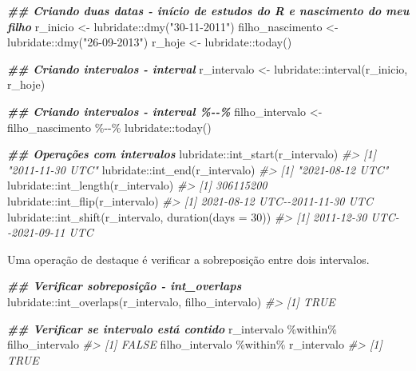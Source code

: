 \documentclass[
]{book}
\newenvironment{Shaded}{\begin{snugshade}}{\end{snugshade}}
\newcommand{\AttributeTok}[1]{\textcolor[rgb]{0.61,0.61,0.61}{#1}}
\newcommand{\CommentTok}[1]{\textcolor[rgb]{0.37,0.37,0.37}{\textit{#1}}}
\newcommand{\DecValTok}[1]{\textcolor[rgb]{0.06,0.06,0.06}{#1}}
\newcommand{\DocumentationTok}[1]{\textcolor[rgb]{0.37,0.37,0.37}{\textbf{\textit{#1}}}}
\newcommand{\FunctionTok}[1]{\textcolor[rgb]{0,0,0}{#1}}
\newcommand{\NormalTok}[1]{#1}
\newcommand{\OtherTok}[1]{\textcolor[rgb]{0.37,0.37,0.37}{#1}}
\newcommand{\SpecialCharTok}[1]{\textcolor[rgb]{0,0,0}{#1}}
\newcommand{\StringTok}[1]{\textcolor[rgb]{0.5,0.5,0.5}{#1}}
\begin{document}
\begin{Shaded}
\begin{Highlighting}[]
\DocumentationTok{\#\# Criando duas datas {-} início de estudos do R e nascimento do meu filho}
\NormalTok{r\_inicio }\OtherTok{\textless{}{-}}\NormalTok{ lubridate}\SpecialCharTok{::}\FunctionTok{dmy}\NormalTok{(}\StringTok{"30{-}11{-}2011"}\NormalTok{)}
\NormalTok{filho\_nascimento }\OtherTok{\textless{}{-}}\NormalTok{ lubridate}\SpecialCharTok{::}\FunctionTok{dmy}\NormalTok{(}\StringTok{"26{-}09{-}2013"}\NormalTok{)}
\NormalTok{r\_hoje }\OtherTok{\textless{}{-}}\NormalTok{ lubridate}\SpecialCharTok{::}\FunctionTok{today}\NormalTok{()}

\DocumentationTok{\#\# Criando intervalos {-} interval}
\NormalTok{r\_intervalo }\OtherTok{\textless{}{-}}\NormalTok{ lubridate}\SpecialCharTok{::}\FunctionTok{interval}\NormalTok{(r\_inicio, r\_hoje)}

\DocumentationTok{\#\# Criando intervalos {-} interval \%{-}{-}\%}
\NormalTok{filho\_intervalo }\OtherTok{\textless{}{-}}\NormalTok{ filho\_nascimento }\SpecialCharTok{\%{-}{-}\%}\NormalTok{ lubridate}\SpecialCharTok{::}\FunctionTok{today}\NormalTok{()}

\DocumentationTok{\#\# Operações com intervalos}
\NormalTok{lubridate}\SpecialCharTok{::}\FunctionTok{int\_start}\NormalTok{(r\_intervalo)}
\CommentTok{\#\textgreater{} [1] "2011{-}11{-}30 UTC"}
\NormalTok{lubridate}\SpecialCharTok{::}\FunctionTok{int\_end}\NormalTok{(r\_intervalo)}
\CommentTok{\#\textgreater{} [1] "2021{-}08{-}12 UTC"}
\NormalTok{lubridate}\SpecialCharTok{::}\FunctionTok{int\_length}\NormalTok{(r\_intervalo)}
\CommentTok{\#\textgreater{} [1] 306115200}
\NormalTok{lubridate}\SpecialCharTok{::}\FunctionTok{int\_flip}\NormalTok{(r\_intervalo)}
\CommentTok{\#\textgreater{} [1] 2021{-}08{-}12 UTC{-}{-}2011{-}11{-}30 UTC}
\NormalTok{lubridate}\SpecialCharTok{::}\FunctionTok{int\_shift}\NormalTok{(r\_intervalo, }\FunctionTok{duration}\NormalTok{(}\AttributeTok{days =} \DecValTok{30}\NormalTok{))}
\CommentTok{\#\textgreater{} [1] 2011{-}12{-}30 UTC{-}{-}2021{-}09{-}11 UTC}
\end{Highlighting}
\end{Shaded}

Uma operação de destaque é verificar a sobreposição entre dois intervalos.

\begin{Shaded}
\begin{Highlighting}[]
\DocumentationTok{\#\# Verificar sobreposição {-} int\_overlaps}
\NormalTok{lubridate}\SpecialCharTok{::}\FunctionTok{int\_overlaps}\NormalTok{(r\_intervalo, filho\_intervalo)}
\CommentTok{\#\textgreater{} [1] TRUE}

\DocumentationTok{\#\# Verificar se intervalo está contido}
\NormalTok{r\_intervalo }\SpecialCharTok{\%within\%}\NormalTok{ filho\_intervalo}
\CommentTok{\#\textgreater{} [1] FALSE}
\NormalTok{filho\_intervalo }\SpecialCharTok{\%within\%}\NormalTok{ r\_intervalo}
\CommentTok{\#\textgreater{} [1] TRUE}
\end{Highlighting}
\end{Shaded}
\end{document}
